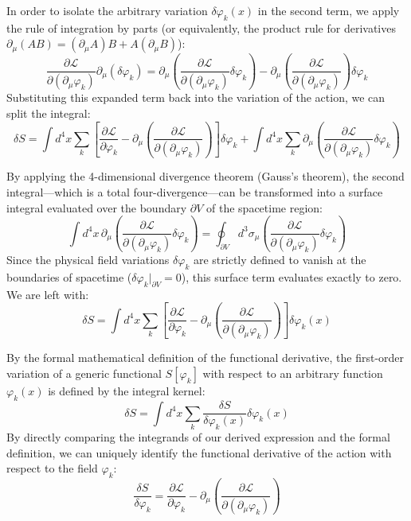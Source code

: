 In order to isolate the arbitrary variation $\delta\varphi_k(x)$ in the second term, we apply the rule of integration by parts (or equivalently, the product rule for derivatives $\partial_\mu(AB) = (\partial_\mu A)B + A(\partial_\mu B)$):
\[
    \frac{\partial \mathcal{L}}{\partial (\partial_\mu \varphi_k)} \partial_\mu (\delta\varphi_k) = \partial_\mu \left( \frac{\partial \mathcal{L}}{\partial (\partial_\mu \varphi_k)} \delta\varphi_k \right) - \partial_\mu \left( \frac{\partial \mathcal{L}}{\partial (\partial_\mu \varphi_k)} \right) \delta\varphi_k
\]
Substituting this expanded term back into the variation of the action, we can split the integral:
\[
    \delta S = \int d^4x \sum_k \left[ \frac{\partial \mathcal{L}}{\partial \varphi_k} - \partial_\mu \left( \frac{\partial \mathcal{L}}{\partial (\partial_\mu \varphi_k)} \right) \right] \delta\varphi_k + \int d^4x \sum_k \partial_\mu \left( \frac{\partial \mathcal{L}}{\partial (\partial_\mu \varphi_k)} \delta\varphi_k \right)
\]

By applying the 4-dimensional divergence theorem (Gauss's theorem), the second integral—which is a total four-divergence—can be transformed into a surface integral evaluated over the boundary $\partial V$ of the spacetime region:
\[
    \int d^4x \, \partial_\mu \left( \frac{\partial \mathcal{L}}{\partial (\partial_\mu \varphi_k)} \delta\varphi_k \right) = \oint_{\partial V} d^3\sigma_\mu \left( \frac{\partial \mathcal{L}}{\partial (\partial_\mu \varphi_k)} \delta\varphi_k \right)
\]
Since the physical field variations $\delta\varphi_k$ are strictly defined to vanish at the boundaries of spacetime ($\delta\varphi_k |_{\partial V} = 0$), this surface term evaluates exactly to zero. We are left with:
\[
    \delta S = \int d^4x \sum_k \left[ \frac{\partial \mathcal{L}}{\partial \varphi_k} - \partial_\mu \left( \frac{\partial \mathcal{L}}{\partial (\partial_\mu \varphi_k)} \right) \right] \delta\varphi_k(x)
\]

By the formal mathematical definition of the functional derivative, the first-order variation of a generic functional $S[\varphi_k]$ with respect to an arbitrary function $\varphi_k(x)$ is defined by the integral kernel:
\[
    \delta S = \int d^4x \sum_k \frac{\delta S}{\delta \varphi_k(x)} \delta\varphi_k(x)
\]
By directly comparing the integrands of our derived expression and the formal definition, we can uniquely identify the functional derivative of the action with respect to the field $\varphi_k$:
\[
    \frac{\delta S}{\delta \varphi_k} = \frac{\partial \mathcal{L}}{\partial \varphi_k} - \partial_\mu \left( \frac{\partial \mathcal{L}}{\partial (\partial_\mu \varphi_k)} \right)
\]

